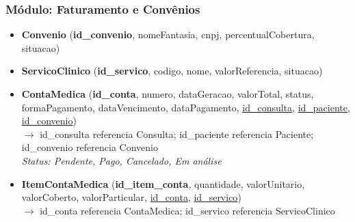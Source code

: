 \subsubsection{Módulo: Faturamento e Convênios}
\begin{itemize}[itemsep=10pt]

    \item \textbf{Convenio} (\textbf{id\_convenio}, nomeFantasia, cnpj, percentualCobertura, situacao)

    \item \textbf{ServicoClinico} (\textbf{id\_servico}, codigo, nome, valorReferencia, situacao)


    \item \textbf{ContaMedica} (\textbf{id\_conta}, numero, dataGeracao, valorTotal, status, formaPagamento, dataVencimento, dataPagamento, \underline{id\_consulta}, \underline{id\_paciente}, \underline{id\_convenio})
    \\{\small $\rightarrow$ id\_consulta referencia Consulta; id\_paciente referencia Paciente; id\_convenio referencia Convenio}
    \\{\small \textit{Status: Pendente, Pago, Cancelado, Em análise}}

    \item \textbf{ItemContaMedica} (\textbf{id\_item\_conta}, quantidade, valorUnitario, valorCoberto, valorParticular, \underline{id\_conta}, \underline{id\_servico})
    \\{\small $\rightarrow$ id\_conta referencia ContaMedica; id\_servico referencia ServicoClinico}

\end{itemize}

